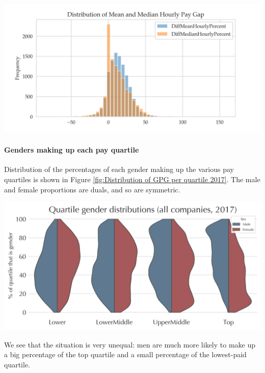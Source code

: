     \begin{centering}
        \includegraphics[width=1\linewidth, scale = 1.7]{images/diff_mean_vs_median.plot.png}
        \label{fig:DiffMedian-DiffMean relation}
    \end{centering}
\vspace{-1.2em}    
\paragraph{Genders making up each pay quartile} 
Distribution of the percentages of each gender making up the various pay quartiles is shown in Figure \ref{fig:Distribution of GPG per quartile 2017}. The male and female proportions are duals, and so are symmetric.
    
        \begin{centering}
        \includegraphics[width=0.99\linewidth]{images/2017-all-companies-quartiles.png}
        \label{fig:Distribution of GPG per quartile 2017}
    \end{centering}
    We see that the situation is very unequal: men are much more likely to make up a big percentage of the top quartile and a small percentage of the lowest-paid quartile.
    
